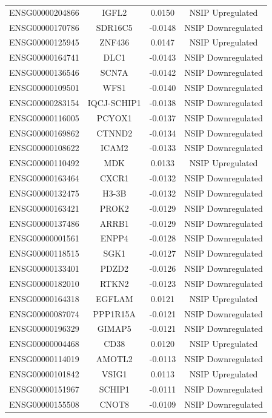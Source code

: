 \documentclass[
]{article}
\begin{document}
\begin{singlespace}
\begin{longtable}[t]{lccc}
ENSG00000204866 & IGFL2 & 0.0150 & NSIP Upregulated\\
ENSG00000170786 & SDR16C5 & -0.0148 & NSIP Downregulated\\
\addlinespace
ENSG00000125945 & ZNF436 & 0.0147 & NSIP Upregulated\\
ENSG00000164741 & DLC1 & -0.0143 & NSIP Downregulated\\
ENSG00000136546 & SCN7A & -0.0142 & NSIP Downregulated\\
ENSG00000109501 & WFS1 & -0.0140 & NSIP Downregulated\\
ENSG00000283154 & IQCJ-SCHIP1 & -0.0138 & NSIP Downregulated\\
\addlinespace
ENSG00000116005 & PCYOX1 & -0.0137 & NSIP Downregulated\\
ENSG00000169862 & CTNND2 & -0.0134 & NSIP Downregulated\\
ENSG00000108622 & ICAM2 & -0.0133 & NSIP Downregulated\\
ENSG00000110492 & MDK & 0.0133 & NSIP Upregulated\\
ENSG00000163464 & CXCR1 & -0.0132 & NSIP Downregulated\\
\addlinespace
ENSG00000132475 & H3-3B & -0.0132 & NSIP Downregulated\\
ENSG00000163421 & PROK2 & -0.0129 & NSIP Downregulated\\
ENSG00000137486 & ARRB1 & -0.0129 & NSIP Downregulated\\
ENSG00000001561 & ENPP4 & -0.0128 & NSIP Downregulated\\
ENSG00000118515 & SGK1 & -0.0127 & NSIP Downregulated\\
\addlinespace
ENSG00000133401 & PDZD2 & -0.0126 & NSIP Downregulated\\
ENSG00000182010 & RTKN2 & -0.0123 & NSIP Downregulated\\
ENSG00000164318 & EGFLAM & 0.0121 & NSIP Upregulated\\
ENSG00000087074 & PPP1R15A & -0.0121 & NSIP Downregulated\\
ENSG00000196329 & GIMAP5 & -0.0121 & NSIP Downregulated\\
\addlinespace
ENSG00000004468 & CD38 & 0.0120 & NSIP Upregulated\\
ENSG00000114019 & AMOTL2 & -0.0113 & NSIP Downregulated\\
ENSG00000101842 & VSIG1 & 0.0113 & NSIP Upregulated\\
ENSG00000151967 & SCHIP1 & -0.0111 & NSIP Downregulated\\
ENSG00000155508 & CNOT8 & -0.0109 & NSIP Downregulated\\

\end{longtable}
\end{singlespace}
\end{document}
